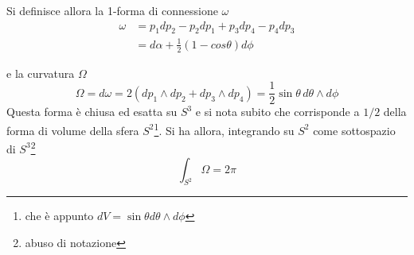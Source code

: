 Si definisce allora la 1-forma di connessione $\omega$
\begin{equation}
   \begin{aligned}
      \omega & = p_1 d p_2 - p_2 d p_1 + p_3 d p_4 - p_4 d p_3 \\
             & = d\alpha + \frac{1}{2}(1 - cos\theta) d \phi
   \end{aligned}
\end{equation}

e la curvatura $\Omega$
$$
   \Omega = d \omega = 2 ( d p_1 \wedge d p_2 + d p_3 \wedge d p_4)
          = \frac{1}{2} \sin\theta \, d\theta \wedge d\phi
$$
Questa forma è chiusa ed esatta su $S^3$ e si nota subito che corrisponde a $1/2$
della forma di volume della sfera $S^2$\footnote{
che è appunto $dV = \sin\theta d\theta \wedge d\phi$}. Si ha allora, integrando
su $S^2$ come sottospazio di $S^3$\footnote{abuso di notazione}
$$
   \int_{S^2} \Omega = 2\pi
$$
